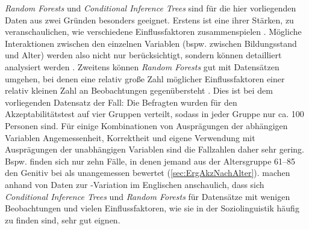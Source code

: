 \textit{Random Forests} und \textit{Conditional Inference Trees} sind für die hier vorliegenden Daten aus zwei Gründen besonders geeignet. 
Erstens ist eine ihrer Stärken, zu veranschaulichen, wie verschiedene Einflussfaktoren zusammenspielen \citep[s.][135]{Tagliamonte.2012}. 
Mögliche Interaktionen zwischen den einzelnen Variablen (bspw. zwischen Bildungsstand und Alter) werden also nicht nur berücksichtigt, sondern können detailliert analysiert werden \citep[s.][169]{Tagliamonte.2012}. 
Zweitens können \textit{Random Forests} gut mit Datensätzen umgehen, bei denen eine relativ große Zahl möglicher Einflussfaktoren einer relativ kleinen Zahl an Beobachtungen gegenübersteht \citep[s.][161--163]{Tagliamonte.2012}.
Dies ist bei dem vorliegenden Datensatz der Fall:
Die Befragten wurden für den Akzeptabilitätstest auf vier Gruppen verteilt, sodass in jeder Gruppe nur ca. 100 Personen sind. 
Für einige Kombinationen von Ausprägungen der abhängigen Variablen \glqq Angemessenheit\grqq, \glqq Korrektheit\grqq{} und \glqq eigene Verwendung\grqq{} mit Ausprägungen der unabhängigen Variablen sind die Fallzahlen daher sehr gering. 
Bspw. finden sich nur zehn Fälle, in denen jemand aus der Altersgruppe 61--85 den Genitiv bei \dank{} als unangemessen bewertet (\autoref{sec:ErgAkzNachAlter}). 
\citet[]{Tagliamonte.2012} machen anhand von Daten zur -Variation im Englischen anschaulich, dass sich \textit{Conditional Inference Trees} und \textit{Random Forests} für Datensätze mit wenigen Beobachtungen und vielen Einflussfaktoren, wie sie in der Soziolinguistik häufig zu finden sind, sehr gut eignen. 

